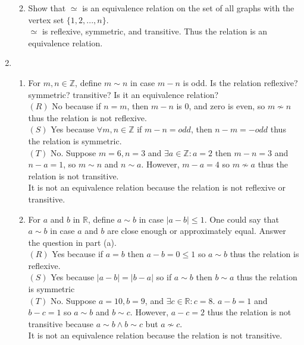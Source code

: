 \documentclass[11pt]{article}
\newcommand{\R}{\mathbb{R}}
\newcommand{\Z}{\mathbb{Z}}
\begin{document}
\begin{enumerate}
\begin{enumerate}
	\item Show that $\simeq$ is an equivalence relation on the set of all graphs with the vertex set $\{1,2,...,n\}$.\\
	$\simeq$ is reflexive, symmetric, and transitive. Thus the relation is an equivalence relation.
	\end{enumerate}
\setcounter{enumi}{7}
\item
	\begin{enumerate}
	\item For $m,n\in\Z$, define $m\sim n$ in case $m-n$ is odd. Is the relation reflexive? symmetric? transitive? Is it an 
	equivalence relation?\\
	$(R)$ No because if $n=m$, then $m-n$ is 0, and zero is even, so $m\not\sim n$ thus the relation is not 
	reflexive.\\
	$(S)$ Yes because $\forall m,n\in\Z$ if $m-n=odd$, then $n-m=-odd$ thus the relation is symmetric.\\
	$(T)$ No. Suppose $m=6,n=3$ and $\exists a\in\Z:a=2$ then $m-n=3$ and $n-a=1$, so $m\sim n$ and $n\sim a$. However, 
	$m-a=4$ so $m\not\sim a$ thus the relation is not transitive.\\
	It is not an equivalence relation because the relation is not reflexive or transitive.
	\item For $a$ and $b$ in $\R$, define $a\sim b$ in case $|a-b|\leq 1$. One could say that $a\sim b$ in case $a$ and $b$ are 
	close enough or approximately equal. Answer the question in part (a).\\
	$(R)$ Yes because if $a=b$ then $a-b=0\leq1$ so $a\sim b$ thus the relation is reflexive.\\
	$(S)$ Yes because $|a-b|=|b-a|$ so if $a\sim b$ then $b\sim a$ thus the relation is symmetric\\
	$(T)$ No. Suppose $a=10,b=9$, and $\exists c\in\R:c=8$. $a-b=1$ and $b-c=1$ so $a\sim b$ and $b\sim c$. However, $a-c=2$ thus 	the relation is not transitive because $a\sim b\wedge b\sim c$ but $a\not\sim c$.\\
	It is not an equivalence relation because the relation is not transitive.

\end{enumerate}
\end{enumerate}
\end{document}
